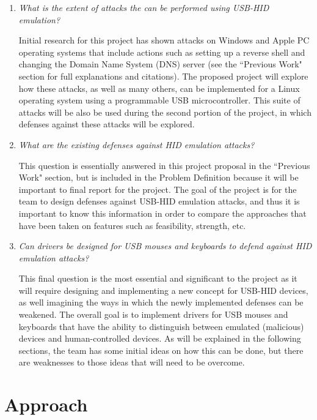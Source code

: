 \documentclass[pagenumbers]{ieee}
\begin{document}
\begin{enumerate}
\item \textit{What is the extent of attacks the can be performed using USB-HID emulation?}

Initial research for this project has shown attacks on Windows and Apple PC operating systems that include actions such as setting up a reverse shell and changing the Domain Name System (DNS) server (see the ``Previous Work" section for full explanations and citations). The proposed project will explore how these attacks, as well as many others, can be implemented for a  Linux operating system using a programmable USB microcontroller. This suite of attacks will be also be used during the second portion of the project, in which defenses against these attacks will be explored.

\item \textit{What are the existing defenses against HID emulation attacks?}

This question is essentially answered in this project proposal in the ``Previous Work" section, but is included in the Problem Definition because it will be important to final report for the project. The goal of the project is for the team to design defenses against USB-HID emulation attacks, and thus it is important to know this information  in order to compare the approaches that have been taken on features such as feasibility, strength, etc.

\item \textit{Can drivers be designed for USB mouses and keyboards to defend against HID emulation attacks?}

This final question is the most essential and significant to the project as it will require designing and implementing a new concept for USB-HID devices, as well imagining the ways in which the newly implemented defenses can be weakened. The overall goal is to implement drivers for USB mouses and keyboards that have the ability to distinguish between emulated (malicious) devices and human-controlled devices. As will be explained in the following sections, the team has some initial ideas on how this can be done, but there are weaknesses to those ideas that will need to be overcome.

\end{enumerate}

\section{Approach}
\end{document}

